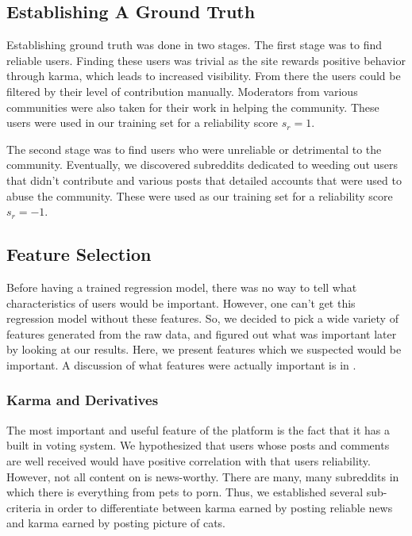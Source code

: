 \subsection{Establishing A Ground Truth} %
\label{sub:establishing_a_ground_truth}
Establishing ground truth was done in two stages. The first stage was to find
reliable users. Finding these users was trivial as the site rewards positive
behavior through karma, which leads to increased visibility. From there the
users could be filtered by their level of contribution manually. Moderators from
various communities were also taken for their work in helping the community.
These users were used in our training set for a reliability score $s_r = 1$.

The second stage was to find users who were unreliable or detrimental to the
community. Eventually, we discovered subreddits dedicated to weeding out users
that didn't contribute and various posts that detailed accounts that were used
to abuse the community. These were used as our training set for a reliability
score $s_r = -1$.


\subsection{Feature Selection} %
\label{sub:feature_selection}

Before having a trained regression model, there was no way to tell what
characteristics of \reddit{} users would be important. However, one can't get
this regression model without these features. So, we decided to pick a wide
variety of features generated from the raw data, and figured out what was
important later by looking at our results. Here, we present features which we
suspected would be important. A discussion of what features were actually
important is in .

\subsubsection{\reddit{} Karma and Derivatives} %
\label{ssub:reddit_karma_and_derivatives}

The most important and useful feature of the \reddit{} platform is the fact that
it has a built in voting system. We hypothesized that users whose posts and
comments are well received would have positive correlation with that users
reliability. However, not all content on \reddit{} is news-worthy. There are
many, many subreddits in which there is everything from pets to porn. Thus, we
established several sub-criteria in order to differentiate between karma earned
by posting reliable news and karma earned by posting picture of cats.


